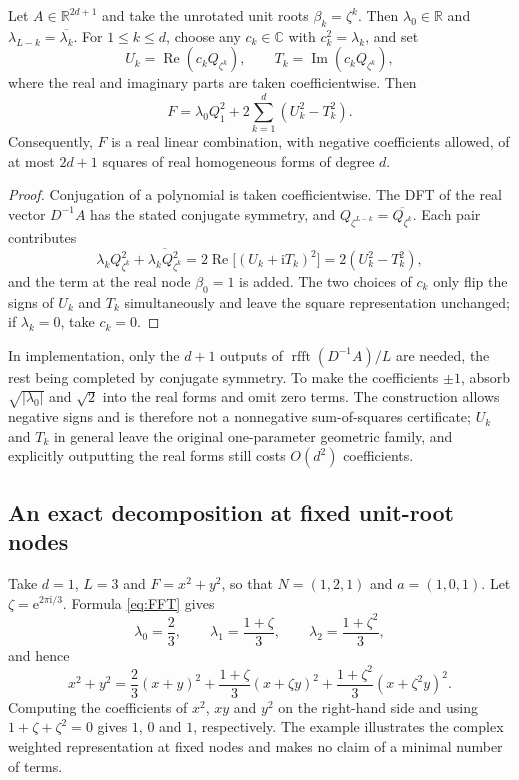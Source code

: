 \documentclass[10pt,twoside,final]{siamart1116}
\numberwithin{equation}{section}
\numberwithin{theorem}{section}
\newcommand{\C}{\mathbb C}
\newcommand{\R}{\mathbb R}
\newcommand{\e}{\mathrm e}
\newcommand{\ii}{\mathrm i}
\begin{document}
\begin{proposition}\label{prop:real}
Let $A\in\R^{2d+1}$ and take the unrotated unit roots $\beta_k=\zeta^k$. Then
$\lambda_0\in\R$ and $\lambda_{L-k}=\overline{\lambda_k}$. For $1\le k\le d$, choose any
$c_k\in\C$ with $c_k^2=\lambda_k$, and set
\[
U_k=\operatorname{Re}(c_kQ_{\zeta^k}),\qquad
T_k=\operatorname{Im}(c_kQ_{\zeta^k}),
\]
where the real and imaginary parts are taken coefficientwise. Then
\begin{equation}\label{eq:real-squares}
F=\lambda_0 Q_1^2+2\sum_{k=1}^{d}(U_k^2-T_k^2).
\end{equation}
Consequently, $F$ is a real linear combination, with negative coefficients allowed, of
at most $2d+1$ squares of real homogeneous forms of degree $d$.
\end{proposition}
\begin{proof}
Conjugation of a polynomial is taken coefficientwise. The DFT of the real vector
$D^{-1}A$ has the stated conjugate symmetry, and
$Q_{\zeta^{L-k}}=\overline{Q_{\zeta^k}}$. Each pair contributes
\[
\lambda_k Q_{\zeta^k}^2+\overline{\lambda_k Q_{\zeta^k}^2}
=2\operatorname{Re}\bigl[(U_k+\ii T_k)^2\bigr]=2(U_k^2-T_k^2),
\]
and the term at the real node $\beta_0=1$ is added. The two choices of $c_k$ only flip
the signs of $U_k$ and $T_k$ simultaneously and leave the square representation
unchanged; if $\lambda_k=0$, take $c_k=0$.
\end{proof}

In implementation, only the $d+1$ outputs of $\operatorname{rfft}(D^{-1}A)/L$ are
needed, the rest being completed by conjugate symmetry. To make the coefficients
$\pm1$, absorb $\sqrt{|\lambda_0|}$ and $\sqrt2$ into the real forms and omit zero
terms. The construction allows negative signs and is therefore not a nonnegative
sum-of-squares certificate; $U_k$ and $T_k$ in general leave the original one-parameter
geometric family, and explicitly outputting the real forms still costs $O(d^2)$
coefficients.

\subsection{An exact decomposition at fixed unit-root nodes}

Take $d=1$, $L=3$ and $F=x^2+y^2$, so that $N=(1,2,1)$ and $a=(1,0,1)$. Let
$\zeta=\e^{2\pi\ii/3}$. Formula \eqref{eq:FFT} gives
\[
\lambda_0=\frac23,\qquad
\lambda_1=\frac{1+\zeta}{3},\qquad
\lambda_2=\frac{1+\zeta^2}{3},
\]
and hence
\begin{equation}\label{eq:small}
x^2+y^2=\frac23(x+y)^2+
\frac{1+\zeta}{3}(x+\zeta y)^2+
\frac{1+\zeta^2}{3}(x+\zeta^2y)^2.
\end{equation}
Computing the coefficients of $x^2$, $xy$ and $y^2$ on the right-hand side and using
$1+\zeta+\zeta^2=0$ gives $1$, $0$ and $1$, respectively. The example illustrates the
complex weighted representation at fixed nodes and makes no claim of a minimal number of
terms.
\end{document}
